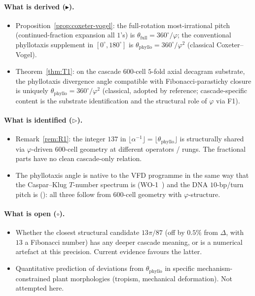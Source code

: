 \documentclass[12pt]{article}
\newcommand{\phig}{\varphi}
\begin{document}
\paragraph{What is derived ($\blacktriangleright$).}
\begin{itemize}
\item Proposition~\ref{prop:coxeter-vogel}: the full-rotation
  most-irrational pitch (continued-fraction expansion all $1$'s)
  is $\theta_{\mathrm{full}} = 360^{\circ}/\phig$; the
  conventional phyllotaxis supplement in $[0^{\circ}, 180^{\circ}]$
  is $\theta_{\mathrm{phyllo}} = 360^{\circ}/\phig^2$
  (classical Coxeter--Vogel).
\item Theorem~\ref{thm:T1}: on the cascade $600$-cell $5$-fold
  axial decagram substrate, the phyllotaxis divergence angle
  compatible with Fibonacci-parastichy closure is uniquely
  $\theta_{\mathrm{phyllo}} = 360^{\circ}/\phig^2$ (classical,
  adopted by reference; cascade-specific content is the substrate
  identification and the structural role of $\phig$ via F1).
\end{itemize}

\paragraph{What is identified ($\triangleright$).}
\begin{itemize}
\item Remark~\ref{rem:R1}: the integer $137$ in
  $\lfloor\alpha^{-1}\rfloor = \lfloor \theta_{\mathrm{phyllo}}
  \rfloor$ is structurally shared via $\phig$-driven $600$-cell
  geometry at different operators / rungs. The fractional parts
  have no clean cascade-only relation.
\item The phyllotaxis angle is native to the VFD programme in the
  same way that the Caspar--Klug $T$-number spectrum is
  (WO-1~\cite{SmartCapsid}) and the DNA $10$-bp/turn pitch is
  (\cite[\S 5.2]{CascadeBio}): all three follow from $600$-cell
  geometry with $\phig$-structure.
\end{itemize}

\paragraph{What is open ($\circ$).}
\begin{itemize}
\item Whether the closest structural candidate $13\pi/87$ (off by
  $0.5\%$ from $\Delta$, with $13$ a Fibonacci number) has any
  deeper cascade meaning, or is a numerical artefact at this
  precision. Current evidence favours the latter.
\item Quantitative prediction of deviations from
  $\theta_{\mathrm{phyllo}}$ in specific mechanism-constrained plant
  morphologies (tropism, mechanical deformation). Not attempted here.
\end{itemize}
\end{document}
